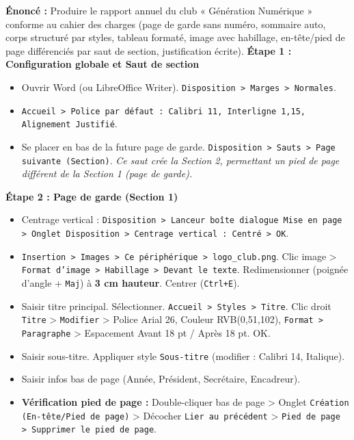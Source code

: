 \documentclass[11pt]{article}
\begin{document}
\begin{exoresolu}
\textbf{Énoncé :} Produire le rapport annuel du club « Génération Numérique » conforme au cahier des charges (page de garde sans numéro, sommaire auto, corps structuré par styles, tableau formaté, image avec habillage, en-tête/pied de page différenciés par saut de section, justification écrite).
\tcblower
\textbf{Étape 1 : Configuration globale et Saut de section}
\begin{itemize}
    \item Ouvrir Word (ou LibreOffice Writer). \texttt{Disposition > Marges > Normales}.
    \item \texttt{Accueil > Police par défaut : Calibri 11, Interligne 1,15, Alignement Justifié}.
    \item Se placer en bas de la future page de garde. \texttt{Disposition > Sauts > Page suivante (Section)}. \emph{Ce saut crée la Section 2, permettant un pied de page différent de la Section 1 (page de garde).}
\end{itemize}

\textbf{Étape 2 : Page de garde (Section 1)}
\begin{itemize}
    \item Centrage vertical : \texttt{Disposition > Lanceur boîte dialogue Mise en page > Onglet Disposition > Centrage vertical : Centré > OK}.
    \item \texttt{Insertion > Images > Ce périphérique > logo\_club.png}. Clic image > \texttt{Format d'image > Habillage > Devant le texte}. Redimensionner (poignée d'angle + \texttt{Maj}) à \textbf{3 cm hauteur}. Centrer (\texttt{Ctrl+E}).
    \item Saisir titre principal. Sélectionner. \texttt{Accueil > Styles > Titre}. Clic droit \texttt{Titre} > \texttt{Modifier} > Police Arial 26, Couleur RVB(0,51,102), \texttt{Format > Paragraphe} > Espacement Avant 18 pt / Après 18 pt. OK.
    \item Saisir sous-titre. Appliquer style \texttt{Sous-titre} (modifier : Calibri 14, Italique).
    \item Saisir infos bas de page (Année, Président, Secrétaire, Encadreur).
    \item \textbf{Vérification pied de page :} Double-cliquer bas de page > Onglet \texttt{Création (En-tête/Pied de page)} > Décocher \texttt{Lier au précédent} > \texttt{Pied de page > Supprimer le pied de page}.
\end{itemize}


\end{exoresolu}
\end{document}
